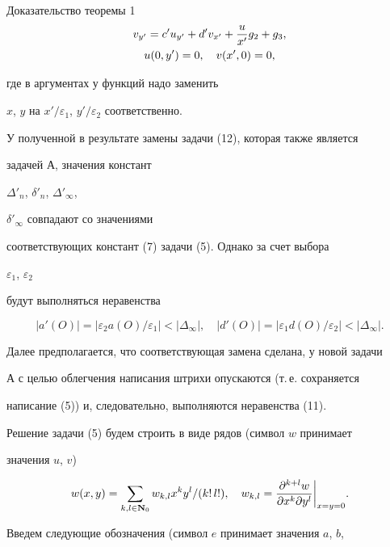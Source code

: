 \begin{pf*}{Доказательство теоремы 1}
\begin{gather}
v_{y'}=c'u_{y'}+d'v_{x'}+\frac{u}{x'}g_2+g_3,\\


u(0,y')=0,\quad v(x',0)=0,\notag


\end{gather}


где в аргументах у функций надо заменить


$x$, $y$ на $x'/\varepsilon_1$, $y'/\varepsilon_2$ соответственно.


У полученной в результате замены задачи (12), которая также является


задачей А, значения констант


$\Delta'_n$, $\delta'_n$, $\Delta'_\infty$,


$\delta'_\infty$ совпадают со значениями


соответствующих констант (7) задачи (5). Однако за счет выбора


$\varepsilon_1$, $\varepsilon_2$


будут выполняться неравенства


$$


|a'(O)|=|\varepsilon_2a(O)/\varepsilon_1|<|\Delta_\infty|,\quad


|d'(O)|=|\varepsilon_1d(O)/\varepsilon_2|<|\Delta_\infty|.


$$





Далее предполагается, что соответствующая замена сделана, у новой задачи


А с целью облегчения написания штрихи опускаются (т.\,е. сохраняется


написание (5)) и, следовательно, выполняются неравенства (11).





Решение задачи (5) будем строить в виде рядов (символ $w$ принимает


значения $u$, $v$)


\begin{equation}


w(x,y)=\sum_{k,l\in\bold N_0}w_{k,l}x^ky^l/(k!\,l!),\quad


w_{k,l}=


\biggl.\frac{\partial^{k+l}w}{\partial x^k\partial y^l}\biggr|_{x=y=0}.


\end{equation}


Введем следующие обозначения (символ $e$ принимает значения $a$, $b$,



\end{pf*}
